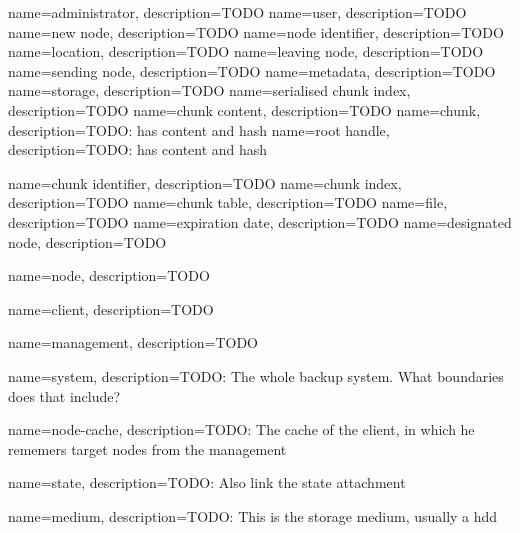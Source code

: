 {
	name={administrator},
	description={TODO}
}
{
	name={user},
	description={TODO}
}
{
	name={new node},
	description={TODO}
}
{
	name={node identifier},
	description={TODO}
}
{
	name={location},
	description={TODO}
}
{
	name={leaving node},
	description={TODO}
}
{
	name={sending node},
	description={TODO}
}
{
	name={metadata},
	description={TODO}
}
{
	name={storage},
	description={TODO}
}
{
	name={serialised chunk index},
	description={TODO}
}
{
	name={chunk content},
	description={TODO}
}
{
	name={chunk},
	description={TODO: has content and hash}
}
{
	name={root handle},
	description={TODO: has content and hash}
}

{
	name={chunk identifier},
	description={TODO}
}
{
	name={chunk index},
	description={TODO}
}
{
	name={chunk table},
	description={TODO}
}
{
	name={file},
	description={TODO}
}
{
	name={expiration date},
	description={TODO}
}
{
	name={designated node},
	description={TODO}
}

{
	name={node},
	description={TODO}
}

{
	name={client},
	description={TODO}
}

{
	name={management},
	description={TODO}
}

{
    name={system},
    description={TODO: The whole backup system. What boundaries does that include?}
}

{
    name={node-cache},
    description={TODO: The cache of the client, in which he rememers target nodes from the management}
}

{
    name={state},
    description={TODO: Also link the state attachment}
}

{
    name={medium},
    description={TODO: This is the storage medium, usually a hdd}
}